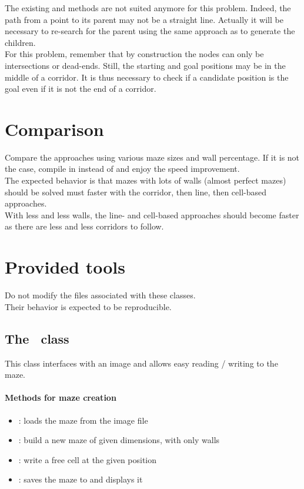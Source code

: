 \documentclass{ecnreport}
\def\maze{\okt{ecn::Maze}~}
\begin{document}
The existing  and  methods are not suited anymore for this problem. Indeed, the path from a point to its parent
may not be a straight line. Actually it will be necessary to re-search for the parent using the same approach as to generate the children.\\

For this problem, remember that by construction the nodes can only be intersections or dead-ends. Still, the starting and goal positions may 
be in the middle of a corridor. It is thus necessary to check if a candidate position is the goal even if it is not the end of a corridor.

\section{Comparison}

Compare the approaches using various maze sizes and wall percentage.
If it is not the case, compile in  instead of  and enjoy the speed improvement.\\

The expected behavior is that mazes with lots of walls (almost perfect mazes) should be solved must faster with the corridor, then line, then cell-based approaches.\\
With less and less walls, the line- and cell-based approaches should become faster as there are less and less corridors to follow.

\appendix

\section{Provided tools}

Do not modify the files associated with these classes.\\Their behavior is expected to be reproducible.

\subsection{The \maze class}\label{mazeClass}

This class interfaces with an image and allows easy reading / writing to the maze. 

\paragraph{Methods for maze creation}
\begin{itemize}
 \item {}: loads the maze from the image file
 \item {}: build a new maze of given dimensions, with only walls
 \item {}: write a free cell at the given position
 \item {}: saves the maze to  and displays it
\end{itemize}
\end{document}
